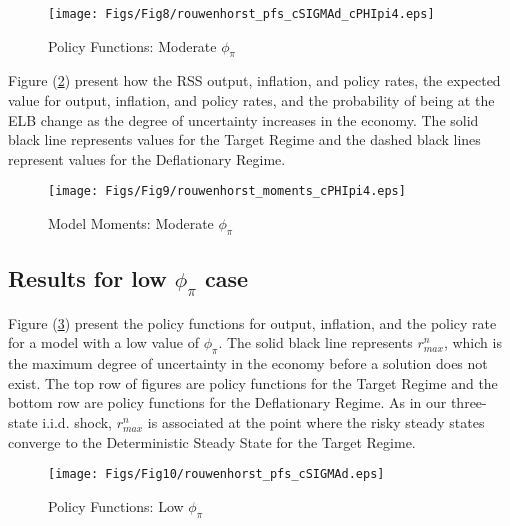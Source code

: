 \documentclass[11pt]{article}
\begin{document}
	\begin{figure}[!ht]
	\begin{center}
		\caption{Policy Functions: Moderate  $\phi_{\pi}$}
		\texttt{[image: Figs/Fig8/rouwenhorst\_pfs\_cSIGMAd\_cPHIpi4.eps]}\label{fig:PFsModeratecPHIpi}
	\end{center}
	\end{figure}
	
	Figure (\ref{fig:MomentsModeratecPHIpi}) present how the RSS output, inflation, and policy rates, the expected value for output, inflation, and policy rates, and the probability of being at the ELB change as the degree of uncertainty increases in the economy. The solid black line represents values for the Target Regime and the dashed black lines represent values for the Deflationary Regime. 
	
	\begin{figure}[!ht]
	\begin{center}
		\caption{Model Moments: Moderate  $\phi_{\pi}$}
		\texttt{[image: Figs/Fig9/rouwenhorst\_moments\_cPHIpi4.eps]}\label{fig:MomentsModeratecPHIpi}
	\end{center}
	\end{figure}
		
	\subsection{Results for low $\phi_{\pi}$ case}	
	
	Figure (\ref{fig:PFsLowcPHIpi}) present the policy functions for output, inflation, and the policy rate for a model with a low value of $\phi_{\pi}$. The solid black line represents $r^n_{max}$, which is the maximum degree of uncertainty in the economy before a solution does not exist. The top row of figures are policy functions for the Target Regime and the bottom row are policy functions for the Deflationary Regime. As in our three-state i.i.d. shock, $r^n_{max}$ is associated at the point where the risky steady states converge to the Deterministic Steady State for the Target Regime. 
	
	\begin{figure}[!ht]
		\begin{center}
			\caption{Policy Functions: Low  $\phi_{\pi}$}
			\texttt{[image: Figs/Fig10/rouwenhorst\_pfs\_cSIGMAd.eps]}\label{fig:PFsLowcPHIpi}
		\end{center}
	\end{figure}
	
\end{document}
